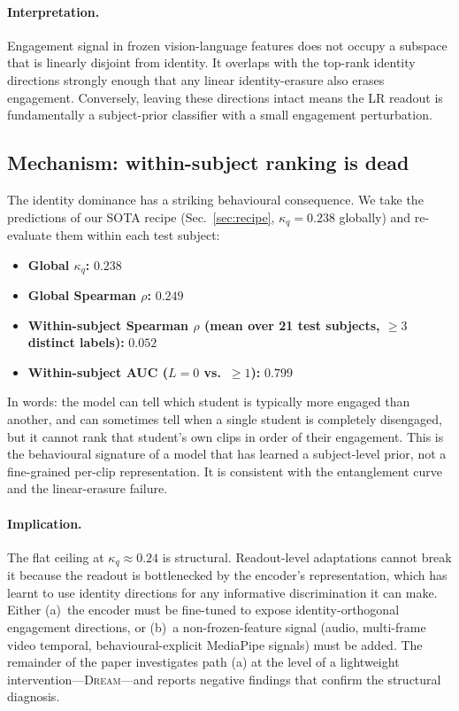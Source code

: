 \paragraph{Interpretation.} Engagement signal in frozen
vision-language features does not occupy a subspace that is
linearly disjoint from identity. It overlaps with the top-rank
identity directions strongly enough that any linear identity-erasure
also erases engagement. Conversely, leaving these directions
intact means the LR readout is fundamentally a subject-prior
classifier with a small engagement perturbation.

\subsection{Mechanism: within-subject ranking is dead}
\label{sec:within}

The identity dominance has a striking behavioural consequence. We
take the predictions of our SOTA recipe (Sec.~\ref{sec:recipe},
$\kappa_q = 0.238$ globally) and re-evaluate them within each test
subject:

\begin{itemize}\itemsep0pt
  \item \textbf{Global $\kappa_q$:} $0.238$
  \item \textbf{Global Spearman $\rho$:} $0.249$
  \item \textbf{Within-subject Spearman $\rho$ (mean over 21 test
  subjects, $\geq 3$ distinct labels):} $0.052$
  \item \textbf{Within-subject AUC ($L = 0$ vs.\ $\geq 1$):} $0.799$
\end{itemize}

In words: the model can tell which student is typically more
engaged than another, and can sometimes tell when a single
student is completely disengaged, but it cannot rank that
student's own clips in order of their engagement. This is the
behavioural signature of a model that has learned a subject-level
prior, not a fine-grained per-clip representation. It is
consistent with the entanglement curve and the linear-erasure
failure.

\paragraph{Implication.} The flat ceiling at $\kappa_q \approx 0.24$
is structural. Readout-level adaptations cannot break it because
the readout is bottlenecked by the encoder's representation, which
has learnt to use identity directions for any informative
discrimination it can make. Either (a)~the encoder must be
fine-tuned to expose identity-orthogonal engagement directions,
or (b)~a non-frozen-feature signal (audio, multi-frame video
temporal, behavioural-explicit MediaPipe signals) must be added.
The remainder of the paper investigates path (a) at the level of
a lightweight intervention---\textsc{Dream}---and reports negative
findings that confirm the structural diagnosis.

